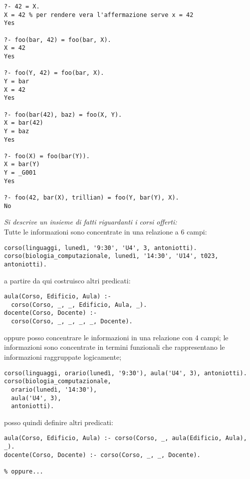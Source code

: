 \documentclass[a4paper,12pt, oneside]{book}
\begin{document}
\begin{itemize}
\begin{verbatim}
?- 42 = X.
X = 42 % per rendere vera l'affermazione serve x = 42
Yes

?- foo(bar, 42) = foo(bar, X).
X = 42
Yes

?- foo(Y, 42) = foo(bar, X).
Y = bar
X = 42
Yes

?- foo(bar(42), baz) = foo(X, Y).
X = bar(42)
Y = baz
Yes

?- foo(X) = foo(bar(Y)).
X = bar(Y)
Y = _G001
Yes

?- foo(42, bar(X), trillian) = foo(Y, bar(Y), X).
No
\end{verbatim}
\begin{esempio}
\textit{Si descrive un insieme di fatti riguardanti i corsi offerti:}\\
Tutte le informazioni sono concentrate in una relazione a 6 campi:
\begin{verbatim}
corso(linguaggi, lunedì, '9:30', 'U4', 3, antoniotti).
corso(biologia_computazionale, lunedì, '14:30', 'U14', t023, antoniotti).
\end{verbatim}
a partire da qui costruisco altri predicati:
\begin{verbatim}
aula(Corso, Edificio, Aula) :-
  corso(Corso, _, _, Edificio, Aula, _).
docente(Corso, Docente) :-
  corso(Corso, _, _, _, _, Docente).
\end{verbatim}
oppure posso concentrare le informazioni in una relazione con 4 campi; le informazioni sono concentrate in termini funzionali che rappresentano le informazioni raggruppate logicamente;
\begin{verbatim}
corso(linguaggi, orario(lunedì, '9:30'), aula('U4', 3), antoniotti).
corso(biologia_computazionale,
  orario(lunedì, '14:30'),
  aula('U4', 3),
  antoniotti).
\end{verbatim}
posso quindi definire altri predicati:
\begin{verbatim}
aula(Corso, Edificio, Aula) :- corso(Corso, _, aula(Edificio, Aula), _).
docente(Corso, Docente) :- corso(Corso, _, _, Docente).

% oppure...


\end{verbatim}
\end{esempio}
\end{itemize}
\end{document}
